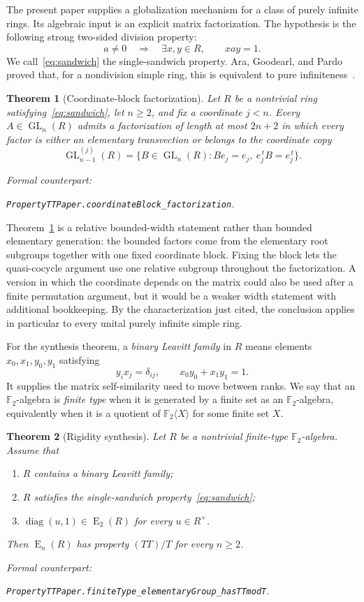 \documentclass[11pt]{amsart}
\newif\ifanonymous\anonymoustrue
\newcommand{\leanrepo}{[repository link removed for anonymous review]}
\newcommand{\leanrepo}{https://github.com/SauersML/group-approximation}
\newcommand{\leanverified}[2]{%
  \par\smallskip\noindent
  {\normalfont\footnotesize\color{gray!70!black}%
  Formal counterpart:\par\nobreak\noindent
  \ifanonymous\nolinkurl{#2}\else
  \href{\leanrepo/blob/main/GroupApproximation/#1.lean}{\nolinkurl{#2}}\fi.}}
\theoremstyle{definition}
\theoremstyle{plain}
\newtheorem{mainthm}{Theorem}
\newcommand{\F}{\mathbb F}
\newcommand{\GL}{\operatorname{GL}}
\newcommand{\EL}{\operatorname{E}}
\newcommand{\diag}{\operatorname{diag}}
\begin{document}
The present paper supplies a globalization mechanism for a class of
purely infinite rings.  Its algebraic input is an explicit
matrix factorization.  The hypothesis is the following strong
two-sided division property:
\begin{equation}\label{eq:sandwich}
  a\ne0\quad\Longrightarrow\quad
  \exists x,y\in R,\qquad xay=1.
\end{equation}
We call~\eqref{eq:sandwich} the single-sandwich property.  Ara, Goodearl, and
Pardo proved that, for a nondivision simple ring, this is equivalent
to pure infiniteness~\cite[Theorem~1.6]{AraGoodearlPardo}.

\begin{mainthm}[Coordinate-block factorization]\label{thm:A}
Let \(R\) be a nontrivial ring satisfying~\eqref{eq:sandwich}, let
\(n\ge2\), and fix a coordinate \(j<n\).  Every \(A\in\GL_n(R)\)
admits a factorization of length at most \(2n+2\) in which every
factor is either an elementary transvection or belongs to the
coordinate copy
\[
  \GL_{n-1}^{(j)}(R)
  =\{B\in\GL_n(R):Be_j=e_j,\ e_j^{\,t}B=e_j^{\,t}\}.
\]
\leanverified{PropertyTT/PaperStatements}{PropertyTTPaper.coordinateBlock_factorization}
\end{mainthm}

Theorem~\ref{thm:A} is a relative bounded-width statement rather
than bounded elementary generation: the bounded factors come from
the elementary root subgroups together with one fixed coordinate
block.  Fixing the block lets the quasi-cocycle argument use one
relative subgroup throughout the factorization.  A version in which
the coordinate depends on the matrix could also be used after a finite
permutation argument, but it would be a weaker width statement with
additional bookkeeping.  By the characterization just cited, the conclusion applies
in particular to every unital purely infinite simple ring.

For the synthesis theorem, a \emph{binary Leavitt family} in \(R\)
means elements \(x_0,x_1,y_0,y_1\) satisfying
\[
  y_i x_j=\delta_{ij},\qquad x_0y_0+x_1y_1=1.
\]
It supplies the matrix self-similarity used to move between ranks.
We say that an \(\F_2\)-algebra is \emph{finite type} when it is
generated by a finite set as an \(\F_2\)-algebra, equivalently when
it is a quotient of \(\F_2\langle X\rangle\) for some finite set
\(X\).

\begin{mainthm}[Rigidity synthesis]\label{thm:B}
Let \(R\) be a nontrivial finite-type \(\F_2\)-algebra.  Assume that
\begin{enumerate}
\item \(R\) contains a binary Leavitt family;
\item \(R\) satisfies the single-sandwich
  property~\eqref{eq:sandwich};
\item \(\diag(u,1)\in\EL_2(R)\) for every \(u\in R^\times\).
\end{enumerate}
Then \(\EL_n(R)\) has property \((TT)/T\) for every \(n\ge2\).
\leanverified{PropertyTT/PaperStatements}{PropertyTTPaper.finiteType_elementaryGroup_hasTTmodT}
\end{mainthm}
\end{document}
